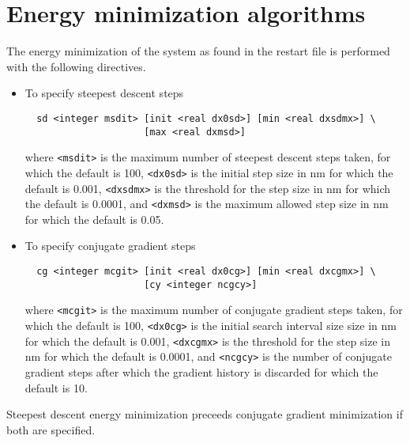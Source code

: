 \section{Energy minimization algorithms}
The energy minimization of the system as found in the restart file 
is performed with the following directives.
\begin{itemize}
\item
To specify steepest descent steps
\begin{verbatim}
  sd <integer msdit> [init <real dx0sd>] [min <real dxsdmx>] \
                     [max <real dxmsd>] 
\end{verbatim}
where \verb+<msdit>+ is the maximum number of steepest descent steps taken,
for which the default is 100, \verb+<dx0sd>+ is the initial step size in nm
for which the default is 0.001, \verb+<dxsdmx>+ is the threshold for the
step size in nm for which the default is 0.0001, and \verb+<dxmsd>+ is the
maximum allowed step size in nm for which the default is 0.05.
\item
To specify conjugate gradient steps
\begin{verbatim}
  cg <integer mcgit> [init <real dx0cg>] [min <real dxcgmx>] \
                     [cy <integer ncgcy>]
\end{verbatim}
where \verb+<mcgit>+ is the maximum number of conjugate gradient steps taken,
for which the default is 100, \verb+<dx0cg>+ is the initial search
interval size size in nm
for which the default is 0.001, \verb+<dxcgmx>+ is the threshold for the
step size in nm for which the default is 0.0001, and \verb+<ncgcy>+
is the number of conjugate gradient steps after which the gradient history
is discarded for which the default is 10.
\end{itemize}
Steepest descent energy minimization preceeds conjugate 
gradient minimization if both are specified.

